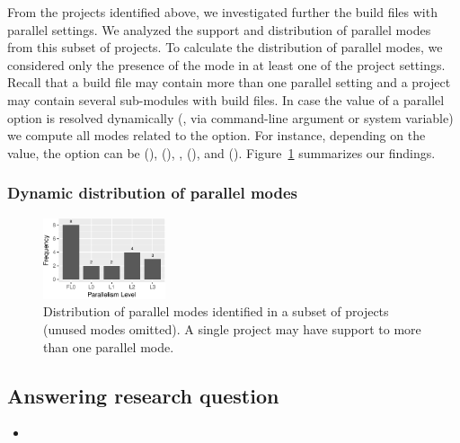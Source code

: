 From the \numProjectsPar{} projects identified above, we investigated
further the \numPomMatchedValid{} build files with parallel settings.
We analyzed the support and distribution of parallel modes from this
subset of projects. To calculate the distribution of parallel modes,
we considered only the presence of the mode in at least one of the
project settings.  Recall that a build file may contain more than one
parallel setting and a project may contain several sub-modules with
build files.  In case the value of a parallel option is resolved
dynamically (\eg, via command-line argument or system variable) we
compute all modes related to the option. For instance, depending on
the value, the  option can be \Seq{} (),
\ParClassSeqMeth{} (), \SeqClassParMeth{},
(), and \ParClassParMeth{} ().
Figure~\ref{fig:freqmodes} summarizes our findings.  

\subsubsection{Dynamic distribution of parallel modes}


\begin{figure}[h!]
    \centering
    \includegraphics[width=0.32\textwidth]{plots/parallel-modes.pdf}
    \caption{\label{fig:freqmodes}Distribution of parallel modes
    identified in a subset of \numProjectsPar{} projects (unused modes
    omitted). A single project may have support to more than one
    parallel mode.}
\end{figure}

\subsection{Answering research question \numRQD{}}
\label{sec:rqD}

\begin{itemize}
    \item \emph{\RQD}
\end{itemize}

